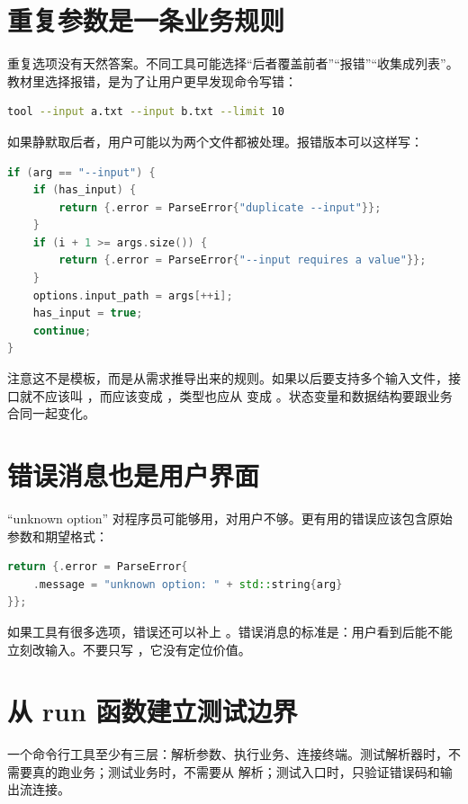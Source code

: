 \section{重复参数是一条业务规则}

重复选项没有天然答案。不同工具可能选择“后者覆盖前者”“报错”“收集成列表”。教材里选择报错，是为了让用户更早发现命令写错：

\begin{lstlisting}[language=bash,caption={重复选项样本}]
tool --input a.txt --input b.txt --limit 10
\end{lstlisting}

如果静默取后者，用户可能以为两个文件都被处理。报错版本可以这样写：

\begin{lstlisting}[language=C++,caption={重复选项检查}]
if (arg == "--input") {
    if (has_input) {
        return {.error = ParseError{"duplicate --input"}};
    }
    if (i + 1 >= args.size()) {
        return {.error = ParseError{"--input requires a value"}};
    }
    options.input_path = args[++i];
    has_input = true;
    continue;
}
\end{lstlisting}

注意这不是模板，而是从需求推导出来的规则。如果以后要支持多个输入文件，接口就不应该叫 ，而应该变成 ，类型也应从  变成 。状态变量和数据结构要跟业务合同一起变化。

\section{错误消息也是用户界面}

“unknown option” 对程序员可能够用，对用户不够。更有用的错误应该包含原始参数和期望格式：

\begin{lstlisting}[language=C++,caption={带上下文的未知选项错误}]
return {.error = ParseError{
    .message = "unknown option: " + std::string{arg}
}};
\end{lstlisting}

如果工具有很多选项，错误还可以补上 。错误消息的标准是：用户看到后能不能立刻改输入。不要只写 ，它没有定位价值。

\section{从 run 函数建立测试边界}

一个命令行工具至少有三层：解析参数、执行业务、连接终端。测试解析器时，不需要真的跑业务；测试业务时，不需要从  解析；测试入口时，只验证错误码和输出流连接。

